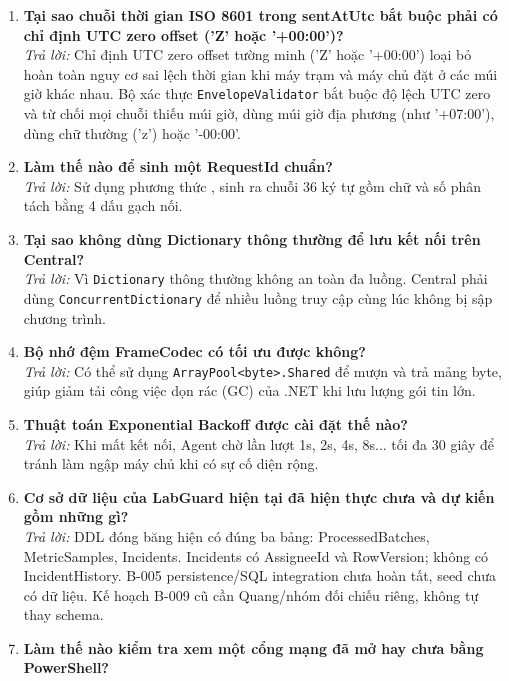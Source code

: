 \documentclass[12pt,a4paper]{article}
\begin{document}
\begin{enumerate}[leftmargin=*, label=\textbf{Câu \arabic*:}]
    \textit{Trả lời:} Đúng 107 bài test tự động, kiểm thử bao phủ toàn bộ các trường hợp hợp lệ, trường hợp biên, đóng khung tin nhị phân và dữ liệu sai hỏng.
  \item \textbf{Tại sao chuỗi thời gian ISO 8601 trong sentAtUtc bắt buộc phải có chỉ định UTC zero offset ('Z' hoặc '+00:00')?} \\
    \textit{Trả lời:} Chỉ định UTC zero offset tường minh ('Z' hoặc '+00:00') loại bỏ hoàn toàn nguy cơ sai lệch thời gian khi máy trạm và máy chủ đặt ở các múi giờ khác nhau. Bộ xác thực \texttt{EnvelopeValidator} bắt buộc độ lệch UTC zero và từ chối mọi chuỗi thiếu múi giờ, dùng múi giờ địa phương (như '+07:00'), dùng chữ thường ('z') hoặc '-00:00'.
  \item \textbf{Làm thế nào để sinh một RequestId chuẩn?} \\
    \textit{Trả lời:} Sử dụng phương thức , sinh ra chuỗi 36 ký tự gồm chữ và số phân tách bằng 4 dấu gạch nối.
  \item \textbf{Tại sao không dùng Dictionary thông thường để lưu kết nối trên Central?} \\
    \textit{Trả lời:} Vì \texttt{Dictionary} thông thường không an toàn đa luồng. Central phải dùng \texttt{Concurrent\allowbreak{}Dictionary} để nhiều luồng truy cập cùng lúc không bị sập chương trình.
  \item \textbf{Bộ nhớ đệm FrameCodec có tối ưu được không?} \\
    \textit{Trả lời:} Có thể sử dụng \texttt{ArrayPool<byte>.Shared} để mượn và trả mảng byte, giúp giảm tải công việc dọn rác (GC) của .NET khi lưu lượng gói tin lớn.
  \item \textbf{Thuật toán Exponential Backoff được cài đặt thế nào?} \\
    \textit{Trả lời:} Khi mất kết nối, Agent chờ lần lượt 1s, 2s, 4s, 8s... tối đa 30 giây để tránh làm ngập máy chủ khi có sự cố diện rộng.
  \item \textbf{Cơ sở dữ liệu của LabGuard hiện tại đã hiện thực chưa và dự kiến gồm những gì?} \\
    \textit{Trả lời:} DDL đóng băng hiện có đúng ba bảng: ProcessedBatches, MetricSamples, Incidents. Incidents có AssigneeId và RowVersion; không có IncidentHistory. B-005 persistence/SQL integration chưa hoàn tất, seed chưa có dữ liệu. Kế hoạch B-009 cũ cần Quang/nhóm đối chiếu riêng, không tự thay schema.
  \item \textbf{Làm thế nào kiểm tra xem một cổng mạng đã mở hay chưa bằng PowerShell?} \\

\end{enumerate}
\end{document}
